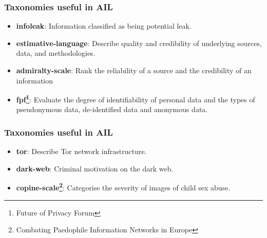 \documentclass{beamer}
\begin{document}
\begin{frame}
    \frametitle{Taxonomies useful in AIL}
        \begin{itemize}
            \item {\bf infoleak}: Information classified as being potential leak.
            \item {\bf estimative-language}: Describe quality and credibility of underlying sources, data, and methodologies.
            \item {\bf admiralty-scale}: Rank the reliability of a source and the credibility of an information
            \item {\bf fpf\footnote{Future of Privacy Forum}}: Evaluate the degree of identifiability of personal data and the types of pseudonymous data, de-identified data and anonymous data.
        \end{itemize}
\end{frame}

\begin{frame}
    \frametitle{Taxonomies useful in AIL}
        \begin{itemize}
            \item {\bf tor}: Describe Tor network infrastructure.
            \item {\bf dark-web}: Criminal motivation on the dark web.
            \item {\bf copine-scale\footnote{Combating Paedophile Information Networks in Europe}}: Categorise the severity of images of child sex abuse.
        \end{itemize}
\end{frame}
\end{document}
